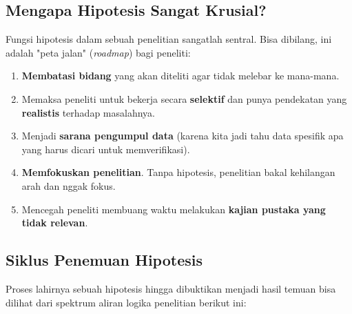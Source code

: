 \documentclass[12pt,a4paper]{article}
\begin{document}
\subsection{Mengapa Hipotesis Sangat Krusial?}
Fungsi hipotesis dalam sebuah penelitian sangatlah sentral. Bisa dibilang, ini adalah "peta jalan" (\textit{roadmap}) bagi peneliti:
\begin{enumerate}
    \item \textbf{Membatasi bidang} yang akan diteliti agar tidak melebar ke mana-mana.
    \item Memaksa peneliti untuk bekerja secara \textbf{selektif} dan punya pendekatan yang \textbf{realistis} terhadap masalahnya.
    \item Menjadi \textbf{sarana pengumpul data} (karena kita jadi tahu data spesifik apa yang harus dicari untuk memverifikasi).
    \item \textbf{Memfokuskan penelitian}. Tanpa hipotesis, penelitian bakal kehilangan arah dan nggak fokus.
    \item Mencegah peneliti membuang waktu melakukan \textbf{kajian pustaka yang tidak relevan}.
\end{enumerate}

\subsection{Siklus Penemuan Hipotesis}
Proses lahirnya sebuah hipotesis hingga dibuktikan menjadi hasil temuan bisa dilihat dari spektrum aliran logika penelitian berikut ini:
\end{document}
